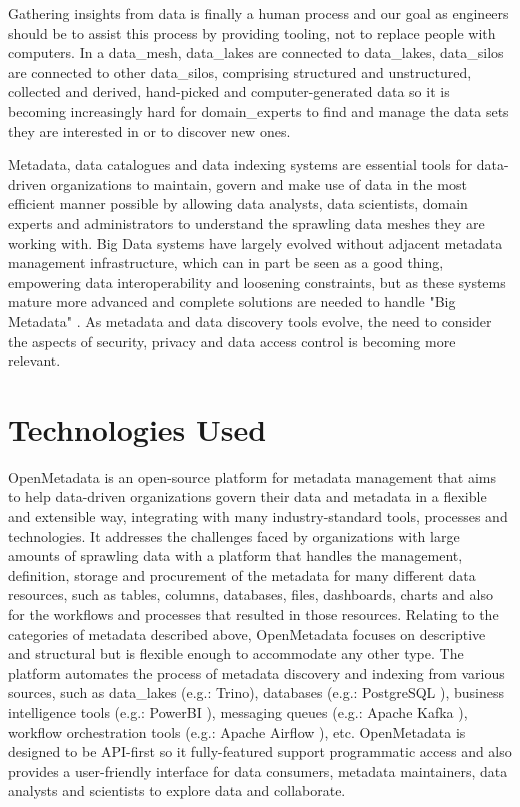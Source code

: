 Gathering insights from data is finally a human process and our goal as engineers should be to assist this process by providing tooling, not to replace people with computers. In a \gls{data_mesh}, \glspl{data_lake} are connected to \glspl{data_lake}, \glspl{data_silo} are connected to other \glspl{data_silo}, comprising structured and unstructured, collected and derived, hand-picked and computer-generated data so it is becoming increasingly hard for \glspl{domain_expert} to find and manage the data sets they are interested in or to discover new ones.

Metadata, data catalogues and data indexing systems are essential tools for data-driven organizations to maintain, govern and make use of data in the most efficient manner possible by allowing data analysts, data scientists, domain experts and administrators to understand the sprawling data meshes they are working with. Big Data systems have largely evolved without adjacent metadata management infrastructure, which can in part be seen as a good thing, empowering data interoperability and loosening constraints, but as these systems mature more advanced and complete solutions are needed to handle "Big Metadata" \cite{bigMetadataSmith2014}. As metadata and data discovery tools evolve, the need to consider the aspects of security, privacy and data access control is becoming more relevant.

\section{Technologies Used}

OpenMetadata is an open-source platform for metadata management that aims to help data-driven organizations govern their data and metadata in a flexible and extensible way, integrating with many industry-standard tools, processes and technologies. It addresses the challenges faced by organizations with large amounts of sprawling data with a platform that handles the management, definition, storage and procurement of the metadata for many different data resources, such as tables, columns, databases, files, dashboards, charts and also for the workflows and processes that resulted in those resources. Relating to the categories of metadata described above, OpenMetadata focuses on descriptive and structural but is flexible enough to accommodate any other type. The platform automates the process of metadata discovery and indexing from various sources, such as \glspl{data_lake} (e.g.: Trino), databases (e.g.: PostgreSQL \cite{postgresqlTech}), business intelligence tools (e.g.: PowerBI \cite{powerbiTech}), messaging queues (e.g.: Apache Kafka \cite{apacheKafkaTech}), workflow orchestration tools (e.g.: Apache Airflow \cite{apacheAirflowTech}), etc. OpenMetadata is designed to be API-first \cite{apiFirstBealieu} so it fully-featured support programmatic access and also provides a user-friendly interface for data consumers, metadata maintainers, data analysts and scientists to explore data and collaborate.

